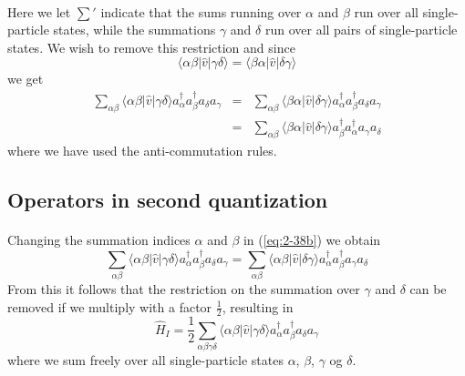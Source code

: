 \documentclass[%
twoside,                 %
final,                   %
10pt]{article}
\begin{document}
\paragraph{}
Here we let $\sum'$ indicate that the sums running over $\alpha$ and $\beta$ run over all
single-particle states, while the summations  $\gamma$ and $\delta$ 
run over all pairs of single-particle states. We wish to remove this restriction and since
\begin{equation}
	\langle \alpha\beta|\hat{v}|\gamma\delta\rangle = \langle \beta\alpha|\hat{v}|\delta\gamma\rangle \label{eq:2-37}
\end{equation}
we get
\begin{eqnarray}
	\sum_{\alpha\beta} \langle \alpha\beta|\hat{v}|\gamma\delta\rangle a^{\dagger}_\alpha a^{\dagger}_\beta a_\delta a_\gamma &=& 
		\sum_{\alpha\beta} \langle \beta\alpha|\hat{v}|\delta\gamma\rangle 
		a^{\dagger}_\alpha a^{\dagger}_\beta a_\delta a_\gamma \label{eq:2-38a} \\
	&=& \sum_{\alpha\beta}\langle \beta\alpha|\hat{v}|\delta\gamma\rangle
		a^{\dagger}_\beta a^{\dagger}_\alpha a_\gamma a_\delta \label{eq:2-38b}
\end{eqnarray}
where we  have used the anti-commutation rules.




\subsection{Operators in second quantization}

\paragraph{}
Changing the summation indices 
$\alpha$ and $\beta$ in (\ref{eq:2-38b}) we obtain
\begin{equation}
	\sum_{\alpha\beta} \langle \alpha\beta|\hat{v}|\gamma\delta\rangle a^{\dagger}_\alpha a^{\dagger}_\beta a_\delta a_\gamma =
		 \sum_{\alpha\beta} \langle \alpha\beta|\hat{v}|\delta\gamma\rangle 
		  a^{\dagger}_\alpha a^{\dagger}_\beta  a_\gamma a_\delta \label{eq:2-38c}
\end{equation}
From this it follows that the restriction on the summation over $\gamma$ and $\delta$ can be removed if we multiply with a factor $\frac{1}{2}$, resulting in 
\begin{equation}
	\hat{H}_I = \frac{1}{2} \sum_{\alpha\beta\gamma\delta} \langle \alpha\beta|\hat{v}|\gamma\delta\rangle
		a^{\dagger}_\alpha a^{\dagger}_\beta a_\delta a_\gamma \label{eq:2-39}
\end{equation}
where we sum freely over all single-particle states $\alpha$, 
$\beta$, $\gamma$ og $\delta$.
\end{document}
